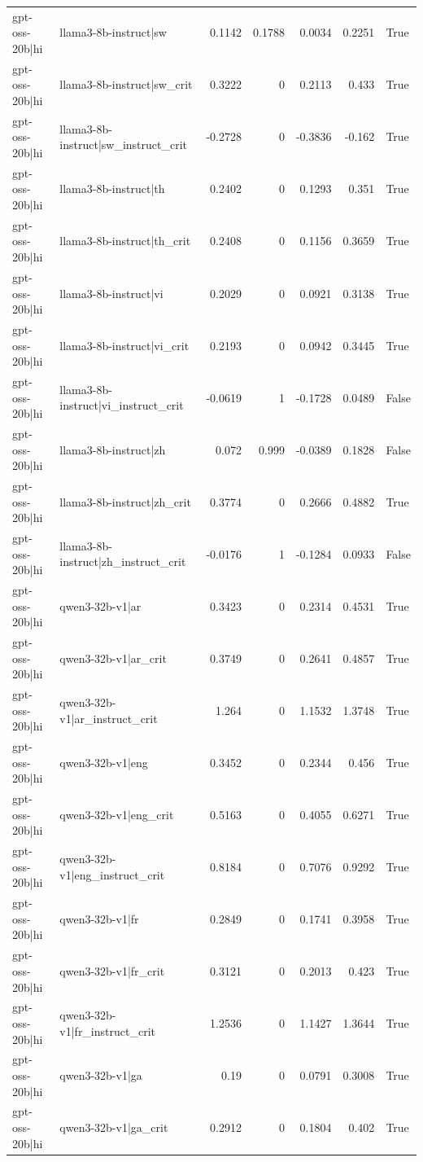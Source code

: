 \begin{table}
\begin{tabular}{l l r r r r l}
gpt-oss-20b|hi & llama3-8b-instruct|sw & 0.1142 & 0.1788 & 0.0034 & 0.2251 & True \\
gpt-oss-20b|hi & llama3-8b-instruct|sw_crit & 0.3222 & 0 & 0.2113 & 0.433 & True \\
gpt-oss-20b|hi & llama3-8b-instruct|sw_instruct_crit & -0.2728 & 0 & -0.3836 & -0.162 & True \\
gpt-oss-20b|hi & llama3-8b-instruct|th & 0.2402 & 0 & 0.1293 & 0.351 & True \\
gpt-oss-20b|hi & llama3-8b-instruct|th_crit & 0.2408 & 0 & 0.1156 & 0.3659 & True \\
gpt-oss-20b|hi & llama3-8b-instruct|vi & 0.2029 & 0 & 0.0921 & 0.3138 & True \\
gpt-oss-20b|hi & llama3-8b-instruct|vi_crit & 0.2193 & 0 & 0.0942 & 0.3445 & True \\
gpt-oss-20b|hi & llama3-8b-instruct|vi_instruct_crit & -0.0619 & 1 & -0.1728 & 0.0489 & False \\
gpt-oss-20b|hi & llama3-8b-instruct|zh & 0.072 & 0.999 & -0.0389 & 0.1828 & False \\
gpt-oss-20b|hi & llama3-8b-instruct|zh_crit & 0.3774 & 0 & 0.2666 & 0.4882 & True \\
gpt-oss-20b|hi & llama3-8b-instruct|zh_instruct_crit & -0.0176 & 1 & -0.1284 & 0.0933 & False \\
gpt-oss-20b|hi & qwen3-32b-v1|ar & 0.3423 & 0 & 0.2314 & 0.4531 & True \\
gpt-oss-20b|hi & qwen3-32b-v1|ar_crit & 0.3749 & 0 & 0.2641 & 0.4857 & True \\
gpt-oss-20b|hi & qwen3-32b-v1|ar_instruct_crit & 1.264 & 0 & 1.1532 & 1.3748 & True \\
gpt-oss-20b|hi & qwen3-32b-v1|eng & 0.3452 & 0 & 0.2344 & 0.456 & True \\
gpt-oss-20b|hi & qwen3-32b-v1|eng_crit & 0.5163 & 0 & 0.4055 & 0.6271 & True \\
gpt-oss-20b|hi & qwen3-32b-v1|eng_instruct_crit & 0.8184 & 0 & 0.7076 & 0.9292 & True \\
gpt-oss-20b|hi & qwen3-32b-v1|fr & 0.2849 & 0 & 0.1741 & 0.3958 & True \\
gpt-oss-20b|hi & qwen3-32b-v1|fr_crit & 0.3121 & 0 & 0.2013 & 0.423 & True \\
gpt-oss-20b|hi & qwen3-32b-v1|fr_instruct_crit & 1.2536 & 0 & 1.1427 & 1.3644 & True \\
gpt-oss-20b|hi & qwen3-32b-v1|ga & 0.19 & 0 & 0.0791 & 0.3008 & True \\
gpt-oss-20b|hi & qwen3-32b-v1|ga_crit & 0.2912 & 0 & 0.1804 & 0.402 & True \\

\end{tabular}
\end{table}
